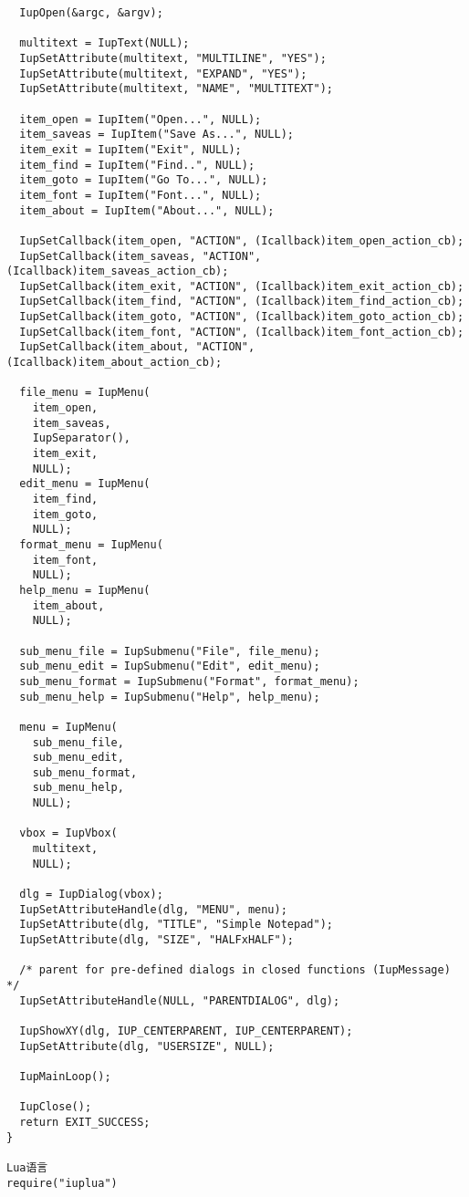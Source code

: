 \documentclass{ctexart}
\begin{document}
\begin{lstlisting}
  IupOpen(&argc, &argv);

  multitext = IupText(NULL);
  IupSetAttribute(multitext, "MULTILINE", "YES");
  IupSetAttribute(multitext, "EXPAND", "YES");
  IupSetAttribute(multitext, "NAME", "MULTITEXT");

  item_open = IupItem("Open...", NULL);
  item_saveas = IupItem("Save As...", NULL);
  item_exit = IupItem("Exit", NULL);
  item_find = IupItem("Find..", NULL);
  item_goto = IupItem("Go To...", NULL);
  item_font = IupItem("Font...", NULL);
  item_about = IupItem("About...", NULL);

  IupSetCallback(item_open, "ACTION", (Icallback)item_open_action_cb);
  IupSetCallback(item_saveas, "ACTION", (Icallback)item_saveas_action_cb);
  IupSetCallback(item_exit, "ACTION", (Icallback)item_exit_action_cb);
  IupSetCallback(item_find, "ACTION", (Icallback)item_find_action_cb);
  IupSetCallback(item_goto, "ACTION", (Icallback)item_goto_action_cb);
  IupSetCallback(item_font, "ACTION", (Icallback)item_font_action_cb);
  IupSetCallback(item_about, "ACTION", (Icallback)item_about_action_cb);

  file_menu = IupMenu(
    item_open,
    item_saveas,
    IupSeparator(),
    item_exit,
    NULL);
  edit_menu = IupMenu(
    item_find,
    item_goto,
    NULL);
  format_menu = IupMenu(
    item_font,
    NULL);
  help_menu = IupMenu(
    item_about,
    NULL);

  sub_menu_file = IupSubmenu("File", file_menu);
  sub_menu_edit = IupSubmenu("Edit", edit_menu);
  sub_menu_format = IupSubmenu("Format", format_menu);
  sub_menu_help = IupSubmenu("Help", help_menu);

  menu = IupMenu(
    sub_menu_file,
    sub_menu_edit,
    sub_menu_format,
    sub_menu_help,
    NULL);

  vbox = IupVbox(
    multitext,
    NULL);

  dlg = IupDialog(vbox);
  IupSetAttributeHandle(dlg, "MENU", menu);
  IupSetAttribute(dlg, "TITLE", "Simple Notepad");
  IupSetAttribute(dlg, "SIZE", "HALFxHALF");

  /* parent for pre-defined dialogs in closed functions (IupMessage) */
  IupSetAttributeHandle(NULL, "PARENTDIALOG", dlg);

  IupShowXY(dlg, IUP_CENTERPARENT, IUP_CENTERPARENT);
  IupSetAttribute(dlg, "USERSIZE", NULL);

  IupMainLoop();

  IupClose();
  return EXIT_SUCCESS;
}

Lua语言
require("iuplua")



\end{lstlisting}
\end{document}
